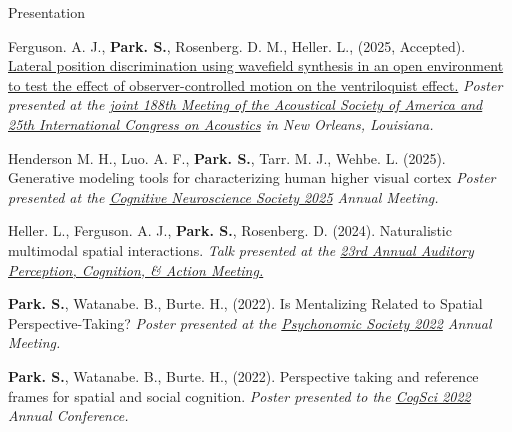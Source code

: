 \documentclass{resume} %
\begin{document}
\begin{rSection}{Presentation}
	\setlength{\hangingindent}{1.27cm}
	
	\begin{hangingpar}
		
		Ferguson. A. J., \textbf{Park. S.}, Rosenberg. D. M., Heller. L., (2025, Accepted). \href{}{Lateral position discrimination using wavefield synthesis in an open environment to test the effect of observer-controlled motion on the ventriloquist effect.}
		\em{Poster presented at the
			\href{}{joint 188th Meeting of the Acoustical Society of America and 25th International Congress on Acoustics} in New Orleans, Louisiana.}
		
	\end{hangingpar}
	
	\begin{hangingpar}
		
		Henderson M. H., Luo. A. F., \textbf{Park. S.}, Tarr. M. J., Wehbe. L. (2025). 
		Generative modeling tools for characterizing human higher visual cortex
		\em{Poster presented at the
			\href{https://www.cogneurosociety.org/poster/?id=6325}{Cognitive Neuroscience Society
				 2025} Annual Meeting.}
		
	\end{hangingpar}
	
	\begin{hangingpar}
		
		Heller. L., Ferguson. A. J., \textbf{Park. S.}, Rosenberg. D. (2024). 
		Naturalistic multimodal spatial interactions.
		\em{Talk presented at the
			\href{https://apcsociety.org/APCAM%202024%20Program.pdf#page=21.10}{23rd Annual Auditory Perception, Cognition, \& Action Meeting.}}
		
	\end{hangingpar}
	
	\begin{hangingpar}
		
		\textbf{Park. S.}, Watanabe. B., Burte. H., (2022). 
		Is Mentalizing Related to Spatial Perspective-Taking? 
		\em{Poster presented at the
			\href{https://www.psychonomic.org/page/2022annualmeeting}{Psychonomic
				Society 2022} Annual Meeting.}
		
	\end{hangingpar}
	
	\begin{hangingpar}
		
		\textbf{Park. S.}, Watanabe. B., Burte. H., (2022). 
		Perspective taking and reference frames for spatial and social 
		cognition. 
		\em{Poster presented to the
			\href{https://cognitivesciencesociety.org/cogsci-2022/}{CogSci 
				2022} Annual Conference.}
		

\end{hangingpar}
\end{rSection}
\end{document}
